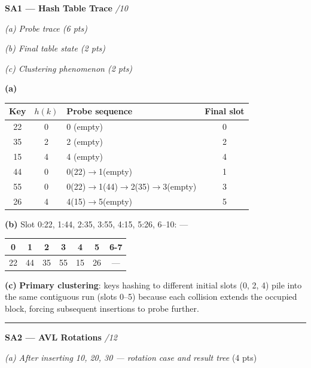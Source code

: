 \documentclass[12pt, addpoints]{exam}
\makeatletter
\newlength{\solindent}\setlength{\solindent}{0.5in}
\renewenvironment{solution}[1][\unanswered]{%
  \def\@solvspace{#1}%
  \ifprintanswers
    \par\smallskip
    \begin{adjustwidth}{\solindent}{\solindent}
    \begin{mdframed}[backgroundcolor=SolutionColor, linewidth=0.4pt,
      linecolor=gray!60, innerleftmargin=5pt, innerrightmargin=5pt,
      innertopmargin=4pt, innerbottommargin=4pt, skipabove=0pt, skipbelow=0pt]%
  \else
    \setbox\z@\vbox\bgroup
  \fi
}{%
  \ifprintanswers
    \end{mdframed}%
    \end{adjustwidth}%
    \par\smallskip
  \else
    \egroup
    \ifdim\ht\z@>\z@\vspace{\ht\z@}\else\vspace{\@solvspace}\fi
  \fi
}
\makeatother
\begin{document}
\bigskip
\noindent\textbf{SA1 — Hash Table Trace} \hfill \textit{/10}

\vspace{4pt}
\noindent\textit{(a) Probe trace \hfill (6 pts)}

\noindent\textit{(b) Final table state \hfill (2 pts)}

\noindent\textit{(c) Clustering phenomenon \hfill (2 pts)}

\begin{solution}
  \textbf{(a)}
  \renewcommand{\arraystretch}{1.3}
  \begin{tabular}{|c|c|l|c|}
    \hline Key & $h(k)$ & Probe sequence & Final slot\\\hline
    22 & 0 & 0 (empty) & 0 \\\hline
    35 & 2 & 2 (empty) & 2 \\\hline
    15 & 4 & 4 (empty) & 4 \\\hline
    44 & 0 & 0(22)$\to$1(empty) & 1 \\\hline
    55 & 0 & 0(22)$\to$1(44)$\to$2(35)$\to$3(empty) & 3 \\\hline
    26 & 4 & 4(15)$\to$5(empty) & 5 \\\hline
  \end{tabular}

  \textbf{(b)} Slot 0:22, 1:44, 2:35, 3:55, 4:15, 5:26, 6–10: ---

    \begin{tabular}{|c|c|c|c|c|c|c|}
    \hline 0 & 1 & 2 & 3 & 4 & 5 & 6-7\\\hline
    22 &44 & 35 & 55 & 15 & 26 & --- \\\hline
  \end{tabular}


  \textbf{(c)} \textbf{Primary clustering}: keys hashing to different initial slots
  (0, 2, 4) pile into the same contiguous run (slots 0–5) because each collision
  extends the occupied block, forcing subsequent insertions to probe further.
\end{solution}

\noindent\rule{\linewidth}{0.4pt}

\newpage
\noindent\textbf{SA2 — AVL Rotations} \hfill \textit{/12}

\vspace{2pt}
\noindent\textit{(a) After inserting 10, 20, 30 — rotation case and result tree} \hfill (4 pts)
\end{document}
